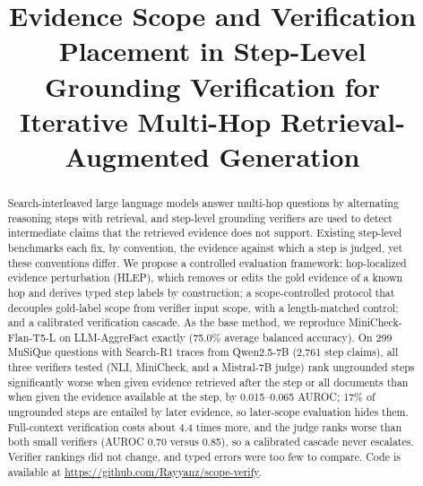 \documentclass[conference]{IEEEtran}
\begin{document}

\title{Evidence Scope and Verification Placement in Step-Level Grounding Verification for Iterative Multi-Hop Retrieval-Augmented Generation}

\author{
}

\maketitle

\begin{abstract}
Search-interleaved large language models answer multi-hop questions by alternating reasoning steps with retrieval, and step-level grounding verifiers are used to detect intermediate claims that the retrieved evidence does not support. Existing step-level benchmarks each fix, by convention, the evidence against which a step is judged, yet these conventions differ. We propose a controlled evaluation framework: hop-localized evidence perturbation (HLEP), which removes or edits the gold evidence of a known hop and derives typed step labels by construction; a scope-controlled protocol that decouples gold-label scope from verifier input scope, with a length-matched control; and a calibrated verification cascade. As the base method, we reproduce MiniCheck-Flan-T5-L on LLM-AggreFact exactly (75.0\% average balanced accuracy). On 299 MuSiQue questions with Search-R1 traces from Qwen2.5-7B (2,761 step claims), all three verifiers tested (NLI, MiniCheck, and a Mistral-7B judge) rank ungrounded steps significantly worse when given evidence retrieved after the step or all documents than when given the evidence available at the step, by 0.015--0.065 AUROC; 17\% of ungrounded steps are entailed by later evidence, so later-scope evaluation hides them. Full-context verification costs about 4.4 times more, and the judge ranks worse than both small verifiers (AUROC 0.70 versus 0.85), so a calibrated cascade never escalates. Verifier rankings did not change, and typed errors were too few to compare. Code is available at \url{https://github.com/Rayyanz/scope-verify}.
\end{abstract}
\end{document}
